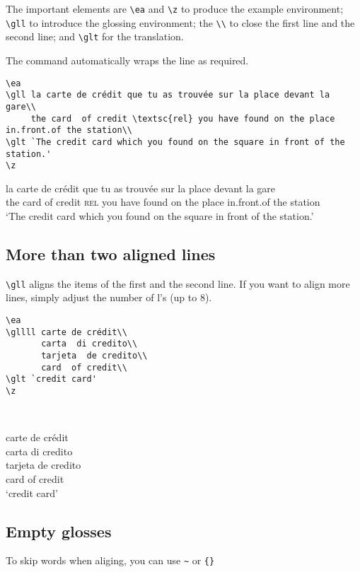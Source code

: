 \documentclass[output=paper]{langscibook}
\newcommand{\cmd}[1]{\texttt{\textbackslash#1}}
\begin{document}
The important elements are \cmd{ea} and \cmd{z} to produce the example environment; \cmd{gll} to introduce the glossing environment; the \texttt{\textbackslash\textbackslash} to close the first line and the second line; and \cmd{glt} for the translation. 

The command automatically wraps the line as required. 
\begin{lstlisting}
\ea
\gll la carte de crédit que tu as trouvée sur la place devant la gare\\
     the card  of credit \textsc{rel} you have found on the place in.front.of the station\\
\glt `The credit card which you found on the square in front of the station.'     
\z
 \end{lstlisting}
\ea
\gll la carte de crédit que tu as trouvée sur la place devant la gare\\
     the card  of credit \textsc{rel} you have found on the place in.front.of the station\\
\glt `The credit card which you found on the square in front of the station.'     
\z



\subsection{More than two aligned lines}
\cmd{gll} aligns the items of the first and the second line. If you want to align more lines, simply adjust the number of l's (up to 8).


\begin{minipage}[t]{.55\textwidth}
\begin{lstlisting}
\ea
\gllll carte de crédit\\
       carta  di credito\\
       tarjeta  de credito\\
       card  of credit\\
\glt `credit card'     
\z
 \end{lstlisting}
\end{minipage}~
\parbox[t]{.45\textwidth}{ 
\ea
\gllll carte de crédit\\
       carta  di credito\\
       tarjeta  de credito\\
       card  of credit\\
\glt `credit card'     
\z
}


\subsection{Empty glosses}
To skip words when aliging, you can use \texttt{\textasciitilde} or \texttt{\{\}}
\end{document}
